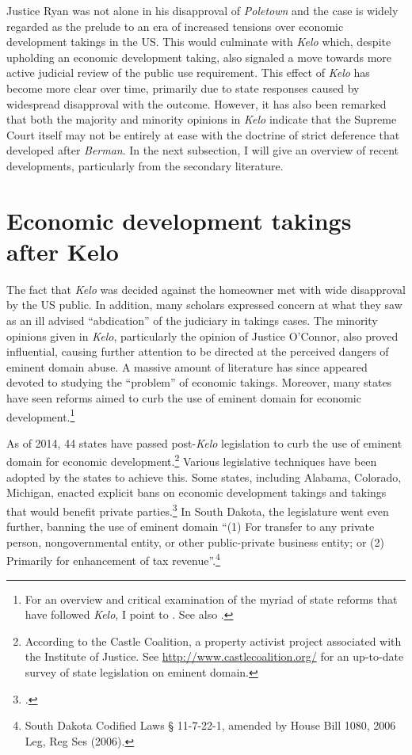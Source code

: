 \documentclass[12pt,a4paper]{book} %
\begin{document}
Justice Ryan was not alone in his disapproval of {\it Poletown} and the case is widely regarded as the prelude to an era of increased tensions over economic development takings in the US. This would culminate with {\it Kelo} which, despite upholding an economic development taking, also signaled a move towards more active judicial review of the public use requirement. This effect of {\it Kelo} has become more clear over time, primarily due to state responses caused by widespread disapproval with the outcome. However, it has also been remarked that both the majority and minority opinions in {\it Kelo} indicate that the Supreme Court itself may not be entirely at ease with the doctrine of strict deference that developed after {\it Berman}. In the next subsection, I will give an overview of recent developments, particularly from the secondary literature.

\section{Economic development takings after Kelo}

The fact that {\it Kelo} was decided against the homeowner met with wide disapproval by the US public. In addition, many scholars expressed concern at what they saw as an ill advised ``abdication'' of the judiciary in takings cases. The minority opinions given in {\it Kelo}, particularly the opinion of Justice O'Connor, also proved influential, causing further attention to be directed at the perceived dangers of eminent domain abuse. A massive amount of literature has since appeared devoted to studying the ``problem'' of economic takings. Moreover,  many states have seen reforms aimed to curb the use of eminent domain for economic development.\footnote{For an overview and critical examination of the myriad of state reforms that have followed {\it Kelo}, I point to \cite{eagle08}. See also \cite{somin09}.} 

As of 2014, 44 states have passed post-{\it Kelo} legislation to curb the use of eminent domain for economic development.\footnote{According to the Castle Coalition, a property activist project associated with the Institute of Justice. See \url{http://www.castlecoalition.org/} for an up-to-date survey of state legislation on eminent domain.} Various legislative techniques have been adopted by the states to achieve this. Some states, including Alabama, Colorado, Michigan, enacted explicit bans on economic development takings and takings that would benefit private parties.\footcite[See][107-108]{eagle08} In South Dakota, the legislature went even further, banning the use of eminent domain  ``(1) For transfer to any private person, nongovernmental entity, or other public-private business entity; or (2) Primarily for enhancement of tax revenue''.\footnote{South Dakota Codified Laws § 11-7-22-1, amended by House Bill 1080, 2006 Leg, Reg Ses (2006).}
\end{document}

